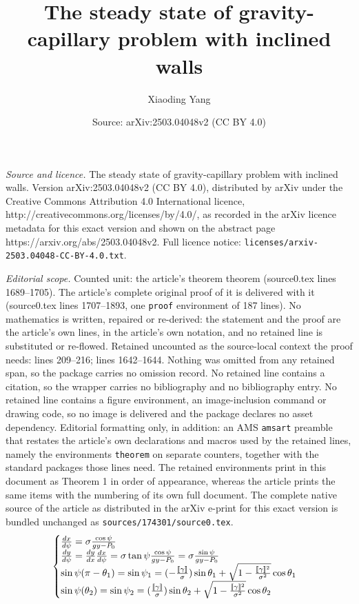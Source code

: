 \documentclass[10pt,a4paper]{amsart}
\title{The steady state of gravity-capillary problem with inclined walls}
\author{Xiaoding Yang}
\date{Source: arXiv:2503.04048v2 (CC BY 4.0)}
\begin{document}
\maketitle

\noindent\emph{Source and licence.} The steady state of gravity-capillary problem with inclined walls. Version arXiv:2503.04048v2 (CC BY 4.0), distributed by arXiv under the Creative Commons Attribution 4.0 International licence, http://creativecommons.org/licenses/by/4.0/, as recorded in the arXiv licence metadata for this exact version and shown on the abstract page https://arxiv.org/abs/2503.04048v2. Full licence notice: \texttt{licenses/arxiv-2503.04048-CC-BY-4.0.txt}.\par\smallskip

\noindent\textit{Editorial scope.} Counted unit: the article's theorem theorem (source0.tex lines 1689--1705). The article's complete original proof of it is delivered with it (source0.tex lines 1707--1893, one \texttt{proof} environment of 187 lines). No mathematics is written, repaired or re-derived: the statement and the proof are the article's own lines, in the article's own notation, and no retained line is substituted or re-flowed.  Retained uncounted as the source-local context the proof needs: lines 209--216; lines 1642--1644.  Nothing was omitted from any retained span, so the package carries no omission record.  No retained line contains a citation, so the wrapper carries no bibliography and no bibliography entry.  No retained line contains a figure environment, an image-inclusion command or drawing code, so no image is delivered and the package declares no asset dependency.  Editorial formatting only, in addition: an AMS \texttt{amsart} preamble that restates the article's own declarations and macros used by the retained lines, namely the environments \texttt{theorem} on separate counters, together with the standard packages those lines need.  The retained environments print in this document as Theorem 1 in order of appearance, whereas the article prints the same items with the numbering of its own full document.  The complete native source of the article as distributed in the arXiv e-print for this exact version is bundled unchanged as \texttt{sources/174301/source0.tex}.
     \begin{equation}{\label{equ:1.2.600}}
    \begin{cases}
        \frac{dx}{d\psi}=\sigma\frac{\cos\psi}{gy-P_{0}}\\
    \frac{dy}{d\psi}=\frac{dy}{dx}\frac{dx}{d\psi}=\sigma\tan\psi\frac{\cos\psi}{gy-P_{0}}=\sigma\frac{\sin\psi}{gy-P_{0}}\\
    \sin\psi(\pi-\theta_1)=\sin\psi_1=(-\frac{[\![\gamma]\!]}{\sigma})\sin\theta_1+\sqrt{1-\frac{[\![\gamma]\!]^{2}}{\sigma^{2}}}\cos\theta_1\\
    \sin\psi(\theta_2)=\sin\psi_{2}=(\frac{[\![\gamma]\!]}{\sigma})\sin\theta_2+\sqrt{1-\frac{[\![\gamma]\!]^{2}}{\sigma^{2}}}\cos\theta_2
    \end{cases}
    \end{equation}
\end{document}
